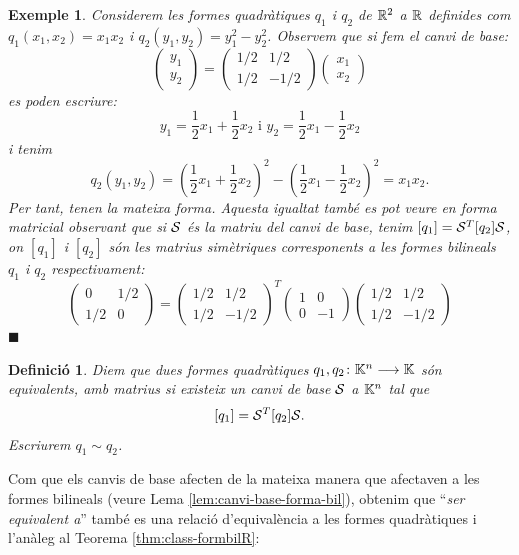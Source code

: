 \documentclass[
  11pt,
]{book}
\numberwithin{dummy}{section}
\theoremstyle{maincolornumbox}
\theoremstyle{blacknumex}
\newtheorem{exampleT}{Exemple}[chapter]
\theoremstyle{blacknumbox}
\newtheorem{definitionT}{Definició}[chapter]
\theoremstyle{maincolornum}
\newenvironment{definition}{\begin{dBox}\begin{definitionT}}{\end{definitionT}\end{dBox}}
\newenvironment{example}{\begin{exampleT}}{\hfill{\tiny\ensuremath{\blacksquare}}\end{exampleT}}
\newlength\esp
\begin{document}
\begin{example}
Considerem les formes quadràtiques \(q_1\) i \(q_2\) de \(\mathbb{R}^2\) a \(\mathbb{R}\)
definides com \(q_1(x_1,x_2)=x_1x_2\) i \(q_2(y_1,y_2)=y_1^2-y_2^2\).
Observem que si fem el canvi de base:
\[\begin{pmatrix} y_1 \\ y_2  \end{pmatrix} =
\begin{pmatrix} 1/2 & 1/2 \\ 1/2 & -1/2 \end{pmatrix}
\begin{pmatrix} x_1 \\ x_2  \end{pmatrix}\] es poden escriure:
\[y_1=\frac12x_1+\frac12x_2 \text{ i } y_2=\frac12x_1-\frac12x_2\] i
tenim
\[q_2(y_1,y_2)=(\frac12x_1+\frac12x_2)^2 - (\frac12x_1-\frac12x_2)^2=x_1x_2 .\]
Per tant, tenen la mateixa forma. Aquesta igualtat també es pot veure en
forma matricial observant que si \(\mathcal{S}\) és la matriu del canvi de base,
tenim \([q_1]=\mathcal{S}^T [q_2] \mathcal{S}\), on \([q_1]\) i \([q_2]\) són les matrius
simètriques corresponents a les formes bilineals \(q_1\) i \(q_2\)
respectivament: \[\begin{pmatrix} 0 & 1/2 \\ 1/2 & 0 \end{pmatrix}=
\begin{pmatrix} 1/2 & 1/2 \\ 1/2 & -1/2 \end{pmatrix}^T
\begin{pmatrix} 1 & 0 \\ 0 & -1 \end{pmatrix}
\begin{pmatrix} 1/2 & 1/2 \\ 1/2 & -1/2 \end{pmatrix}\]
\end{example}

\begin{definition}
Diem que dues formes quadràtiques \(q_1,q_2\colon \mathbb{K}^n\longrightarrow \mathbb{K}\) \emph{són
equivalents}, amb matrius si existeix un canvi de base \(\mathcal{S}\) a \(\mathbb{K}^n\)
tal que \[[q_1]=\mathcal{S}^T [q_2] \mathcal{S}.\] Escriurem \(q_1\sim q_2\).
\end{definition}

Com que els canvis de base afecten de la mateixa manera que afectaven a
les formes bilineals (veure Lema
\ref{lem:canvi-base-forma-bil}), obtenim que ``\emph{ser equivalent
a}'' també es una relació d'equivalència a les formes quadràtiques i
l'anàleg al Teorema
\ref{thm:class-formbilR}:
\end{document}
